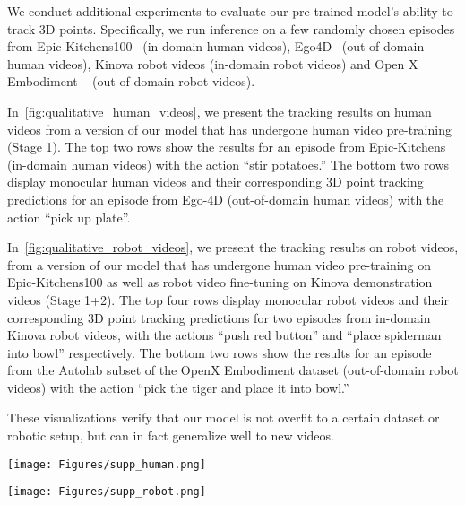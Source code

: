 We conduct additional experiments to evaluate our pre-trained model's ability to track 3D points. Specifically, we run inference on a few randomly chosen episodes from Epic-Kitchens100~\cite{Damen2018EPICKITCHENS} (in-domain human videos), Ego4D~\cite{Ego4D2021} (out-of-domain human videos), Kinova robot videos (in-domain robot videos) and  Open X Embodiment ~\cite{open_x_embodiment_rt_x_2023} (out-of-domain robot videos). 

In~\cref{fig:qualitative_human_videos}, we present the tracking results on human videos from a version of our model that has undergone human video pre-training (Stage 1).  The top two rows show the results for an episode from Epic-Kitchens (in-domain human videos) with the action ``stir potatoes.'' The bottom two rows display monocular human videos and their corresponding 3D point tracking predictions for an episode from Ego-4D (out-of-domain human videos) with the action ``pick up plate''. 

In~\cref{fig:qualitative_robot_videos}, we present the tracking results on robot videos, from a version of our model that has undergone human video pre-training on Epic-Kitchens100 as well as robot video fine-tuning on Kinova demonstration videos (Stage 1+2). The top four rows display monocular robot videos and their corresponding 3D point tracking predictions for two episodes from in-domain Kinova robot videos, with the actions ``push red button'' and ``place spiderman into bowl'' respectively. The bottom two rows show the results for an episode from the Autolab subset of the OpenX Embodiment dataset (out-of-domain robot videos) with the action ``pick the tiger and place it into bowl.''



These visualizations verify that our model is not overfit to a certain dataset or robotic setup, but can in fact generalize well to new videos.


\begin{figure*}[ht!]
    \centering
    \texttt{[image: Figures/supp\_human.png]}
    \caption{Visualization of \smodel{}'s 3D Point Track results on randomly chosen Epic-Kitchens (in-domain) and Ego-4D (out-of-domain) human videos.}
    \label{fig:qualitative_human_videos}
\end{figure*}


\begin{figure*}[ht!]
    \centering
    \texttt{[image: Figures/supp\_robot.png]}
    \caption{Visualization of \smodel{}'s 3D Point Track results on randomly chosen Kinova (in-domain) and Open X-Embodiment (out-of-domain) robot videos.}
    \label{fig:qualitative_robot_videos}
\end{figure*}



